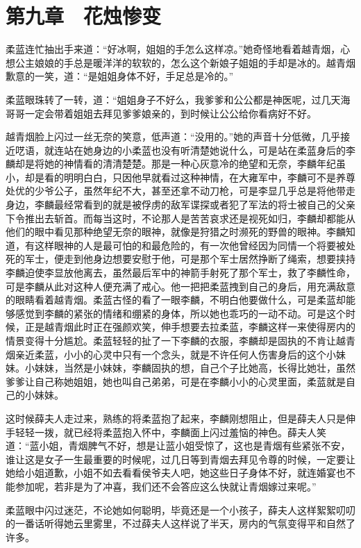 \chapter{第九章　花烛惨变}

柔蓝连忙抽出手来道：“好冰啊，姐姐的手怎么这样凉。”她奇怪地看着越青烟，心想公主娘娘的手总是暖洋洋的软软的，怎么这个新娘子姐姐的手却是冰的。越青烟歉意的一笑，道：“是姐姐身体不好，手足总是冷的。”

柔蓝眼珠转了一转，道：“姐姐身子不好么，我爹爹和公公都是神医呢，过几天海哥哥一定会带着姐姐去拜见爹爹娘亲的，到时候让公公给你看病好不好。

越青烟脸上闪过一丝无奈的笑意，低声道：“没用的。”她的声音十分低微，几乎接近呓语，就连站在她身边的小柔蓝也没有听清楚她说什么，可是站在柔蓝身后的李麟却是将她的神情看的清清楚楚。那是一种心灰意冷的绝望和无奈，李麟年纪虽小，却是看的明明白白，只因他早就看过这种神情，在大雍军中，李麟可不是养尊处优的少爷公子，虽然年纪不大，甚至还拿不动刀枪，可是李显几乎总是将他带走身边，李麟最经常看到的就是被俘虏的敌军谍探或者犯了军法的将士被自己的父亲下令推出去斩首。而每当这时，不论那人是苦苦哀求还是视死如归，李麟却都能从他们的眼中看见那种绝望无奈的眼神，就像是狩猎之时濒死的野兽的眼神。李麟知道，有这样眼神的人是最可怕的和最危险的，有一次他曾经因为同情一个将要被处死的军士，便走到他身边想要安慰于他，可是那个军士居然挣断了绳索，想要挟持李麟迫使李显放他离去，虽然最后军中的神箭手射死了那个军士，救了李麟性命，可是李麟从此对这种人便充满了戒心。他一把把柔蓝拽到自己的身后，用充满敌意的眼睛看着越青烟。柔蓝古怪的看了一眼李麟，不明白他要做什么，可是柔蓝却能够感觉到李麟的紧张的情绪和绷紧的身体，所以她也乖巧的一动不动。可是这个时候，正是越青烟此时正在强颜欢笑，伸手想要去拉柔蓝，李麟这样一来使得房内的情景变得十分尴尬。柔蓝轻轻的扯了一下李麟的衣服，李麟却是固执的不肯让越青烟亲近柔蓝，小小的心灵中只有一个念头，就是不许任何人伤害身后的这个小妹妹。小妹妹，当然是小妹妹，李麟固执的想，自己个子比她高，长得比她壮，虽然爹爹让自己称她姐姐，她也叫自己弟弟，可是在李麟小小的心灵里面，柔蓝就是自己的小妹妹。

这时候薛夫人走过来，熟练的将柔蓝抱了起来，李麟刚想阻止，但是薛夫人只是伸手轻轻一拨，就已经将柔蓝抱入怀中，李麟面上闪过羞恼的神色。薛夫人笑道：“蓝小姐，青烟脾气不好，想是让蓝小姐受惊了，这也是青烟有些紧张不安，谁让这是女子一生最重要的时候呢，过几日等到青烟去拜见令尊的时候，一定要让她给小姐道歉，小姐不如去看看侯爷夫人吧，她这些日子身体不好，就连婚宴也不能参加呢，若非是为了冲喜，我们还不会答应这么快就让青烟嫁过来呢。”

柔蓝眼中闪过迷茫，不论她如何聪明，毕竟还是一个小孩子，薛夫人这样絮絮叨叨的一番话听得她云里雾里，不过薛夫人这样说了半天，房内的气氛变得平和自然了许多。

